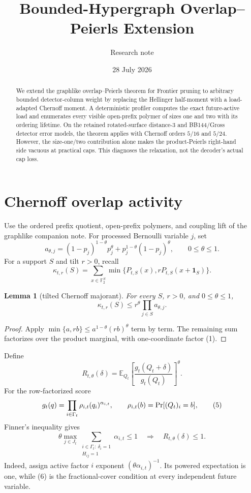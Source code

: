 \documentclass[11pt]{article}
\title{Bounded-Hypergraph Overlap--Peierls Extension}
\author{Research note}
\date{28 July 2026}
\newtheorem{lemma}[theorem]{Lemma}
\newcommand{\F}{\mathbb F}
\newcommand{\E}{\mathbb E}
\newcommand{\Prb}{\mathop{\rm Pr}}
\newcommand{\1}{\mathbf 1}
\begin{document}
\maketitle

\begin{abstract}
We extend the graphlike overlap--Peierls theorem for Frontier pruning to
arbitrary bounded detector-column weight by replacing the Hellinger
half-moment with a load-adapted Chernoff moment.  A deterministic profiler
computes the exact future-active load and enumerates every visible
open-prefix polymer of sizes one and two with its ordering lifetime.  On the
retained rotated-surface distance-3 and BB144/Gross detector error models,
the theorem applies with Chernoff orders \(5/16\) and \(5/24\).  However, the
size-one/two contribution alone makes the product-Peierls right-hand side
vacuous at practical caps.  This diagnoses the relaxation, not the decoder's
actual cap loss.
\end{abstract}

\section{Chernoff overlap activity}

Use the ordered prefix quotient, open-prefix polymers, and coupling lift of
the graphlike companion note.  For processed Bernoulli variable \(j\), set
\[
 a_{\theta,j}
 =
 (1-p_j)^{1-\theta}p_j^\theta
 +
 p_j^{1-\theta}(1-p_j)^\theta,
 \qquad 0\le\theta\le1.
\tag{1}
\]
For a support \(S\) and tilt \(r>0\), recall
\[
 \kappa_{t,r}(S)
 =
 \sum_{x\in\F_2^S}
 \min\{P_{t,S}(x),rP_{t,S}(x+\1_S)\}.
\tag{2}
\]

\begin{lemma}[tilted Chernoff majorant]
For every \(S\), \(r>0\), and \(0\le\theta\le1\),
\[
\boxed{
 \kappa_{t,r}(S)
 \le r^\theta\prod_{j\in S}a_{\theta,j}.}
\tag{3}
\]
\end{lemma}

\begin{proof}
Apply
\(\min\{a,rb\}\le a^{1-\theta}(rb)^\theta\) term by term.  The
remaining sum factorizes over the product marginal, with one-coordinate
factor (1).
\end{proof}

Define
\[
 R_{t,\theta}(\delta)
 =
 \E_{Q_t}
 \left[
 \frac{g_t(Q_t+\delta)}{g_t(Q_t)}
 \right]^\theta.
\tag{4}
\]
For the row-factorized score
\[
 g_t(q)
 =
 \prod_{i\in\Gamma_t}
 \rho_{i,t}(q_i)^{\alpha_{i,t}},
 \qquad
 \rho_{i,t}(b)=\Prb[(Q_t)_i=b],
\tag{5}
\]
Finner's inequality gives
\[
\boxed{
 \theta
 \max_{j\in J_t}
 \sum_{\substack{i\in\Gamma_t:\ \delta_i=1\\H_{ij}=1}}
 \alpha_{i,t}
 \le1
 \quad\Longrightarrow\quad
 R_{t,\theta}(\delta)\le1.}
\tag{6}
\]
Indeed, assign active factor \(i\) exponent
\((\theta\alpha_{i,t})^{-1}\).  Its powered expectation is one, while
(6) is the fractional-cover condition at every independent future
variable.
\end{document}
